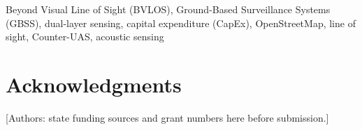 \documentclass[journal]{IEEEtran}
\begin{document}
\begin{IEEEkeywords}
Beyond Visual Line of Sight (BVLOS), Ground-Based Surveillance Systems (GBSS), dual-layer sensing, capital expenditure (CapEx), OpenStreetMap, line of sight, Counter-UAS, acoustic sensing
\end{IEEEkeywords}










\section*{Acknowledgments}
[Authors: state funding sources and grant numbers here before submission.]



\end{document}
